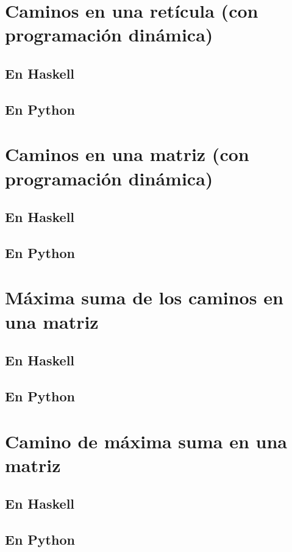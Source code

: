 \documentclass[a4paper,12pt,twoside]{book}
\begin{document}
\section{Caminos en una retícula (con programación dinámica)}
\subsection{En Haskell}
\subsection{En Python}

\section{Caminos en una matriz (con programación dinámica)}
\subsection{En Haskell}
\subsection{En Python}

\section{Máxima suma de los caminos en una matriz}
\subsection{En Haskell}
\subsection{En Python}

\section{Camino de máxima suma en una matriz}
\subsection{En Haskell}
\subsection{En Python}
\end{document}
